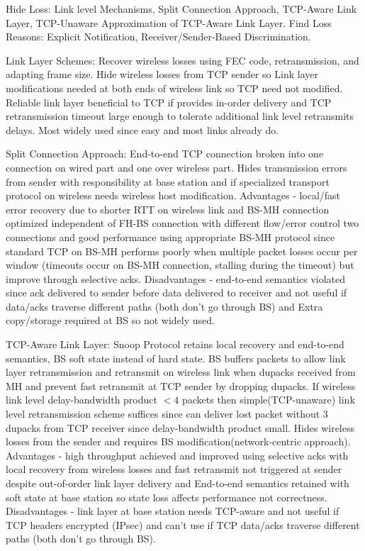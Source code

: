 \documentclass[8pt]{extarticle}
\begin{document}
\begin{multicols}{2}
Hide Loss: Link level Mechanisms, Split Connection Approach, TCP-Aware Link Layer, TCP-Unaware Approximation of TCP-Aware Link Layer. Find Loss Reasons: Explicit Notification, Receiver/Sender-Based Discrimination.

Link Layer Schemes: Recover wireless losses using FEC code, retransmission, and adapting frame size. Hide wireless losses from TCP sender so Link layer modifications needed at both ends of wireless link so TCP need not modified. Reliable link layer beneficial to TCP if provides in-order delivery and TCP retransmission timeout large enough to tolerate additional link level retransmits delays. Most widely used since easy and most links already do.

Split Connection Approach: End-to-end TCP connection broken into one connection on wired part and one over wireless part. Hides transmission errors from sender with responsibility at base station and if specialized transport protocol on wireless needs wireless host modification.  Advantages - local/fast error recovery due to shorter RTT on wireless link and  BS-MH connection optimized independent of FH-BS connection with different flow/error control two connections and good performance using appropriate BS-MH protocol since standard TCP on BS-MH performs poorly when multiple packet losses occur per window (timeouts occur on BS-MH connection, stalling during the timeout) but improve through selective acks. Disadvantages - end-to-end semantics violated since ack delivered to sender before data delivered to receiver and not useful if data/acks traverse different paths (both don't go through BS) and Extra copy/storage required at BS so not widely used.

TCP-Aware Link Layer: Snoop Protocol retains local recovery and end-to-end semantics, BS soft state instead of hard state. BS buffers packets to allow link layer retransmission and retransmit on wireless link when dupacks received from MH and prevent fast retransmit at TCP sender by dropping dupacks. If wireless link level delay-bandwidth product $<4$ packets then simple(TCP-unaware) link level retransmission scheme suffices since can deliver lost packet without 3 dupacks from TCP receiver since delay-bandwidth product small. Hides wireless losses from the sender and requires BS modification(network-centric approach). Advantages - high throughput achieved and improved using selective acks with local recovery from wireless losses and fast retransmit not triggered at sender despite out-of-order link layer delivery and End-to-end semantics retained with soft state at base station so state loss affects performance not correctness. Disadvantages - link layer at base station needs TCP-aware and not useful if TCP headers encrypted (IPsec) and can't use if TCP data/acks traverse different paths (both don't go through BS).


\end{multicols}
\end{document}
